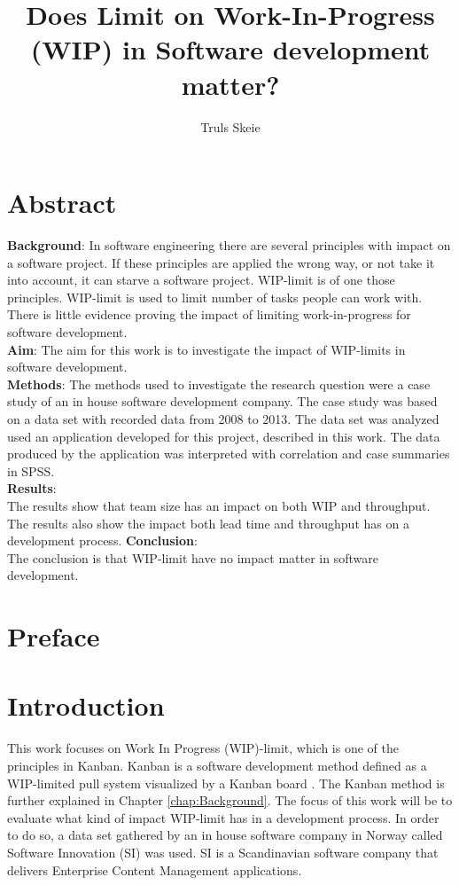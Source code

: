 \documentclass[UKenglish]{ifimaster}  %
\title{Does Limit on Work-In-Progress (WIP) in Software development matter?}        %
\author{Truls Skeie}                      %
\begin{document}
\ififorside{}
\frontmatter{}
\maketitle{}

\chapter*{Abstract}                   %
\textbf{Background}: 
In software engineering there are several principles with impact on a software project. If these principles are applied the wrong way, or not take it into account, it can starve a software project. WIP-limit is of one those principles.  WIP-limit is used to limit number of tasks people can work with. There is little evidence proving the impact of limiting work-in-progress for software development.\\
\textbf{Aim}: 
The aim for this work is to investigate the impact of WIP-limits in software development. \\
\textbf{Methods}:
The methods used to investigate the research question were a case study of an in house software development company. The case study was based on a data set with recorded data from 2008 to 2013. The data set was analyzed used an application developed for this project, described in this work. The data produced by the application was interpreted with correlation and case summaries in SPSS.\\
\textbf{Results}:\\
The results show that team size has an impact on both WIP and throughput. The results also show the impact both lead time and throughput has on a development process. 
\textbf{Conclusion}:\\
The conclusion is that WIP-limit have no impact matter in software development. 

\tableofcontents{}
\listoffigures{}
\listoftables{}
\lstlistoflistings{}

\chapter*{Preface}                    %

\mainmatter{}
\chapter{Introduction}
\label{chap:intro}
This work focuses on Work In Progress (WIP)-limit, which is one of the principles in Kanban. Kanban is a software development method defined as a WIP-limited pull system visualized by a Kanban board \parencite{DavidAnderson}. The Kanban method is further explained in Chapter \ref{chap:Background}. The focus of this work will be to evaluate what kind of impact WIP-limit has in a development process. In order to do so, a data set gathered by an in house software company in Norway called Software Innovation (SI) was used. SI is a Scandinavian software company that delivers Enterprise Content Management applications.
\end{document}
